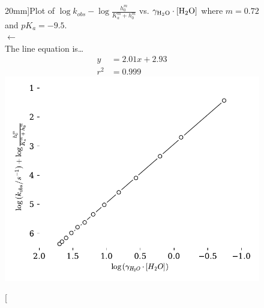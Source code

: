 \documentclass[]{tufte-handout}
\begin{document}
\begin{figure}[h!]
  \centering
  \caption[][20mm]{Plot of $\log{k_{obs}}-\log{\frac{h_0^m}{K_a^m + h_0^m}}$ vs. $\gamma_{\ce{H2O}} \cdot [\ce{H2O}]$ where $m = 0.72$ and $pK_a = -9.5$. \\ $\longleftarrow$ \\ The line equation is\ldots \begin{align*}y &= 2.01x+2.93 \\ r^2 &= 0.999\end{align*}} 
  \includegraphics[scale=0.7]{images/fig16}
  \label{fig:fig16}
\end{figure}
\end{document}
